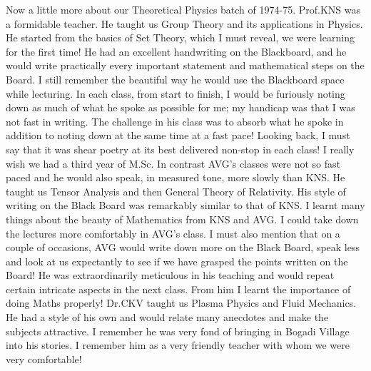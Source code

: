 Now a little more about our Theoretical Physics batch of 1974-75. Prof.KNS was a formidable teacher. He taught us Group Theory and its applications in Physics. He started from the basics of Set Theory, which I must reveal, we were learning for the first time! He had an excellent handwriting on the Blackboard, and he would write practically every important statement and mathematical steps on the Board. I still remember the beautiful way he would use the Blackboard space while lecturing. In each class, from start to finish, I would be furiously noting down as much of what he spoke as possible for me; my handicap was that I was not fast in writing. The challenge in his class was to absorb what he spoke in addition to noting down at the same time at a fast pace! Looking back, I must say that it was shear poetry at its best delivered non-stop in each class! I really wish we had a third year of M.Sc. In contrast AVG's classes were not so fast paced and he would also speak, in measured tone, more slowly than KNS. He taught us Tensor Analysis and then General Theory of Relativity. His style of writing on the Black Board was remarkably similar to that of KNS. I learnt many things about the beauty of Mathematics from KNS and AVG. I could take down the lectures more comfortably in AVG's class. I must also mention that on a couple of occasions, AVG would write down more on the Black Board, speak less and look at us expectantly to see if we have grasped the points written on the Board! He was extraordinarily meticulous in his teaching and would repeat certain intricate aspects in the next class. From him I learnt the importance of doing Maths properly! Dr.CKV taught us Plasma Physics and Fluid Mechanics. He had a style of his own and would relate many anecdotes and make the subjects attractive. I remember he was very fond of bringing in Bogadi Village into his stories. I remember him as a very friendly teacher with whom we were very comfortable!

